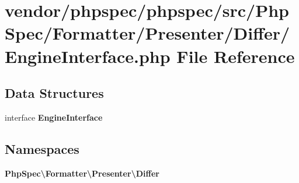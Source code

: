 \section{vendor/phpspec/phpspec/src/\+Php\+Spec/\+Formatter/\+Presenter/\+Differ/\+Engine\+Interface.php File Reference}
\label{phpspec_2phpspec_2src_2_php_spec_2_formatter_2_presenter_2_differ_2_engine_interface_8php}
\subsection*{Data Structures}
\begin{DoxyCompactItemize}
\item 
interface {\bf Engine\+Interface}
\end{DoxyCompactItemize}
\subsection*{Namespaces}
\begin{DoxyCompactItemize}
\item 
 {\bf Php\+Spec\textbackslash{}\+Formatter\textbackslash{}\+Presenter\textbackslash{}\+Differ}
\end{DoxyCompactItemize}
